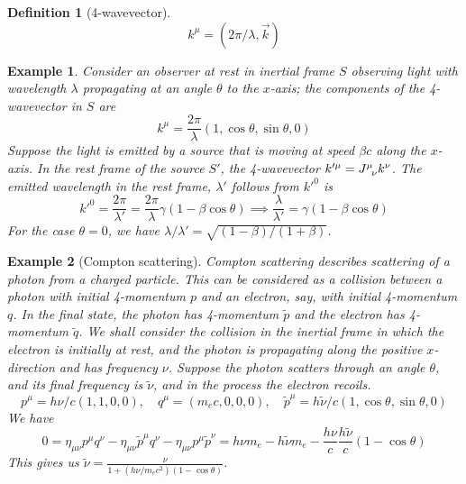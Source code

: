 \documentclass[a4paper]{article}
\newtheorem{eg}{Example}[section]
\theoremstyle{new}
\newtheorem{defi}{Definition}[section]
\begin{document}
\begin{defi}[4-wavevector]
$$k^\mu=(2\pi/\lambda,\vec{k})$$
\end{defi}
\begin{eg}
Consider an observer at rest in inertial frame $S$ observing light with wavelength $\lambda$ propagating at an angle $\theta$ to the $x$-axis; the components of the 4-wavevector in $S$ are
$$k^\mu=\frac{2\pi}{\lambda}(1,\cos\theta,\sin\theta,0)$$
Suppose the light is emitted by a source that is moving at speed $\beta c$ along the $x$-axis. In the rest frame of the source $S'$, the 4-wavevector $k'^\mu=\tensor*{J}{*_{}^{\mu}_{\nu}}k^\nu$. The emitted wavelength in the rest frame, $\lambda'$ follows from $k'^0$ is
$$k'^0=\frac{2\pi}{\lambda'}=\frac{2\pi}{\lambda}\gamma(1-\beta\cos\theta)\implies\frac{\lambda}{\lambda'}=\gamma(1-\beta\cos\theta)$$
For the case $\theta=0$, we have $\lambda/\lambda'=\sqrt{(1-\beta)/(1+\beta)}$.
\end{eg}
\begin{eg}[Compton scattering]
Compton scattering describes scattering of a photon from a charged particle. This can be considered as a collision between a photon with initial 4-momentum $p$ and an electron, say, with initial 4-momentum $q$. In the final state, the photon has 4-momentum $\tilde{p}$ and the electron has 4-momentum $\tilde{q}$. We shall consider the collision in the inertial frame in which the electron is initially at rest, and the photon is propagating along the positive $x$-direction and has frequency $\nu$. Suppose the photon scatters through an angle $\theta$, and its final frequency is $\tilde{\nu}$, and in the process the electron recoils. 
$$p^\mu=h\nu/c(1,1,0,0),\quad q^\mu=(m_ec,0,0,0),\quad\tilde{p}^\mu=h\tilde{\nu}/c(1,\cos\theta,\sin\theta,0)$$
We have
$$0=\eta_{\mu\nu}p^\mu q^\nu-\eta_{\mu\nu}\tilde{p}^\mu q^\nu-\eta_{\mu\nu}p^\mu\tilde{p}^\nu=h\nu m_e-h\tilde{\nu}m_e-\frac{h\nu}{c}\frac{h\tilde{\nu}}{c}(1-\cos\theta)$$
This gives us $\tilde{\nu}=\frac{\nu}{1+(h\nu/m_ec^2)(1-\cos\theta)}$. 
\end{eg}
\end{document}

